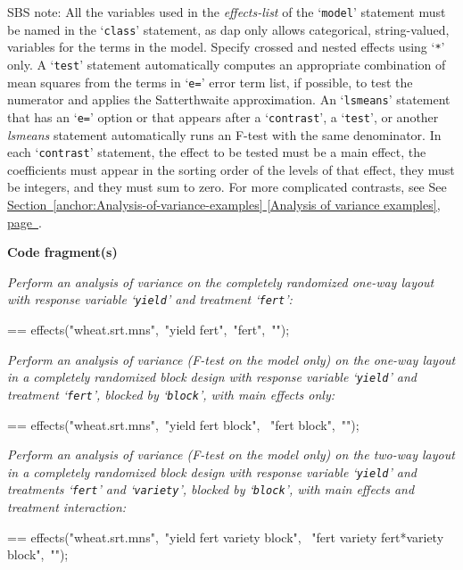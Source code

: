 \documentclass{book}
\makeatletter
\newcommand\Texinfocommandstyletextvar[1]{{\normalfont{}\textsl{#1}}}%
\newenvironment{Texinfopreformatted}{%
  \par\GNUTobeylines\obeyspaces\frenchspacing\parskip=\z@\parindent=\z@}{}
{\catcode`\^^M=13 \gdef\GNUTobeylines{\catcode`\^^M=13 \def^^M{\null\par}}}
\newenvironment{Texinfoindented}{\begin{list}{}{}\item\relax}{\end{list}}
\renewcommand{\_}{\Texinfounderscore\discretionary{}{}{}}
\makeatother
\begin{document}
SBS note: All the variables used in the \Texinfocommandstyletextvar{effects-list} of the `\texttt{model}'
statement must be named in the `\texttt{class}' statement, as dap only
allows categorical, string-valued, variables for the terms in the model.
Specify crossed and nested effects using `\texttt{*}' only.
A `\texttt{test}' statement automatically computes an appropriate combination of mean
squares from the terms in `\texttt{e=}' error term list, if possible, to test the numerator and
applies the Satterthwaite approximation.
An `\texttt{lsmeans}' statement that has an `\texttt{e=}' option or that appears after
a `\texttt{contrast}', a `\texttt{test}', or another \Texinfocommandstyletextvar{lsmeans} statement
automatically runs an F-test with the same denominator.
In each `\texttt{contrast}' statement, the effect to be tested must be a main effect,
the coefficients must appear in the sorting order of the
levels of that effect, they must be integers, and they must sum to zero.
For more complicated contrasts, see See \hyperref[anchor:Analysis-of-variance-examples]{Section~\ref*{anchor:Analysis-of-variance-examples} [Analysis of variance examples], page~\pageref*{anchor:Analysis-of-variance-examples}}.

\noindent{}\textbf{Code fragment(s)}

\emph{Perform an analysis of variance on the completely randomized
one-way layout with
response variable `\texttt{yield}' and treatment `\texttt{fert}':}
\begin{Texinfoindented}
\begin{Texinfopreformatted}%
\ttfamily effects("wheat.srt.mns",\ "yield fert",\ "fert",\ "");
\end{Texinfopreformatted}
\end{Texinfoindented}

\emph{Perform an analysis of variance (F-test on the model only)
on the one-way layout in a completely randomized block design with
response variable `\texttt{yield}' and treatment `\texttt{fert}',
blocked by `\texttt{block}', with main effects only:}
\begin{Texinfoindented}
\begin{Texinfopreformatted}%
\ttfamily effects("wheat.srt.mns",\ "yield fert block",
\                 "fert block",\ "");
\end{Texinfopreformatted}
\end{Texinfoindented}

\emph{Perform an analysis of variance (F-test on the model only)
on the two-way layout in a completely randomized block design with
response variable `\texttt{yield}' and treatments `\texttt{fert}' and
`\texttt{variety}', blocked by `\texttt{block}', with main effects
and treatment interaction:}
\begin{Texinfoindented}
\begin{Texinfopreformatted}%
\ttfamily effects("wheat.srt.mns",\ "yield fert variety block",
\                 "fert variety fert*variety block",\ "");
\end{Texinfopreformatted}
\end{Texinfoindented}
\end{document}
